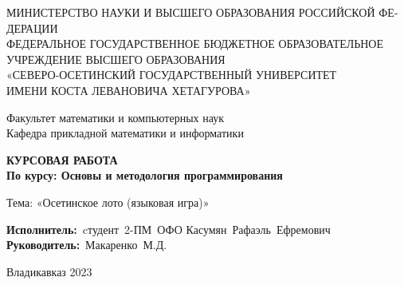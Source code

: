 \documentclass[14pt, a4paper]{extarticle}
\begin{document}
\onehalfspacing
\setdefaultlanguage[spelling=modern]{russian}
    
\setmonofont{Times New Roman}
\setmainfont{Times New Roman} 
\newfontfamily{}
\newfontfamily{}
\begin{titlepage}
\newpage
\begin{center}
\small{МИНИСТЕРСТВО НАУКИ И ВЫСШЕГО ОБРАЗОВАНИЯ РОССИЙСКОЙ ФЕДЕРАЦИИ \\
     ФЕДЕРАЛЬНОЕ ГОСУДАРСТВЕННОЕ БЮДЖЕТНОЕ ОБРАЗОВАТЕЛЬНОЕ \\
     УЧРЕЖДЕНИЕ ВЫСШЕГО ОБРАЗОВАНИЯ \\
     «СЕВЕРО-ОСЕТИНСКИЙ ГОСУДАРСТВЕННЫЙ УНИВЕРСИТЕТ \\
     ИМЕНИ КОСТА ЛЕВАНОВИЧА ХЕТАГУРОВА» \\}
\end{center}
\vspace {2em}
\begin{center}
\small{Факультет математики и компьютерных наук \\
     Кафедра прикладной математики и информатики \\
     }
\end{center}
\vspace{2em}
\begin{center}
\textbf{КУРСОВАЯ РАБОТА} \\ 
\vspace{2em}
\textbf{По курсу: Основы и методология программирования} \\
\end{center}
\vspace{1.1em}
\begin{center}
Тема: «Осетинское лото (языковая игра)»
\end{center}
\vspace{3em}
\begin{flushright}
      \vbox{%
\hfill%
\vbox{%
\hbox{\textbf{Исполнитель:} cтудент 2-ПМ ОФО}%
\hbox{Касумян Рафаэль Ефремович}%
\hbox{\textbf{Руководитель:} Макаренко М.Д.}
}%
} 
\end{flushright}
\vspace{8em}
\begin{center}
Владикавказ 2023 \\
\end{center}
\end{titlepage}
\setcounter{page}{2} %
\newpage 
\begin{center}
    \tableofcontents
\end{center}
\end{document}
